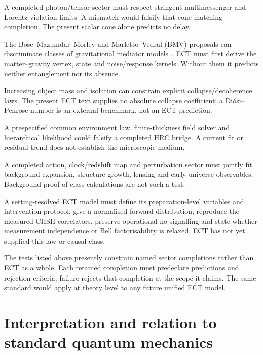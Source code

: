 \documentclass[11pt,a4paper]{article}
\begin{document}
\begin{description}[leftmargin=1.6em,itemsep=3pt]
\item[Propagation.]  A completed photon/tensor sector must respect stringent
multimessenger and Lorentz-violation limits.  A mismatch would falsify that
cone-matching completion.  The present scalar cone alone predicts no delay.
\item[Gravity-mediated entanglement.]  The Bose--Mazumdar--Morley and
Marletto--Vedral (BMV) proposals can discriminate classes of gravitational
mediator models~\cite{Bose_Mazumdar_Morley_2017,Marletto_Vedral_2017_GIE}.
ECT must first derive the matter--gravity vertex, state and noise/response
kernels.  Without them it predicts neither entanglement nor its absence.
\item[Macroscopic interference and collapse.]  Increasing object mass and
isolation can constrain explicit collapse/decoherence laws.  The present ECT
text supplies no absolute collapse coefficient; a Di\'osi--Penrose number is
an external benchmark, not an ECT prediction.
\item[Galaxies.]  A prespecified common environment law, finite-thickness field
solver and hierarchical likelihood could falsify a completed HRC bridge.  A
current fit or residual trend does not establish the microscopic medium.
\item[Cosmology.]  A completed action, clock/redshift map and perturbation
sector must jointly fit background expansion, structure growth, lensing and
early-universe observables.  Background proof-of-class calculations are not
such a test.
\item[Bell correlations.]  A setting-resolved ECT model must define its
preparation-level variables and intervention protocol, give a normalised
forward distribution, reproduce the measured CHSH correlators, preserve
operational no-signalling and state whether measurement independence or Bell
factorisability is relaxed.  ECT has not yet supplied this law or causal class.
\end{description}

The tests listed above presently constrain named sector completions rather
than ECT as a whole.  Each retained completion must predeclare predictions and
rejection criteria; failure rejects that completion at the scope it claims.
The same standard would apply at theory level to any future unified ECT model.

\section{Interpretation and relation to standard quantum mechanics}
\label{sec:interpretation}
\end{document}

